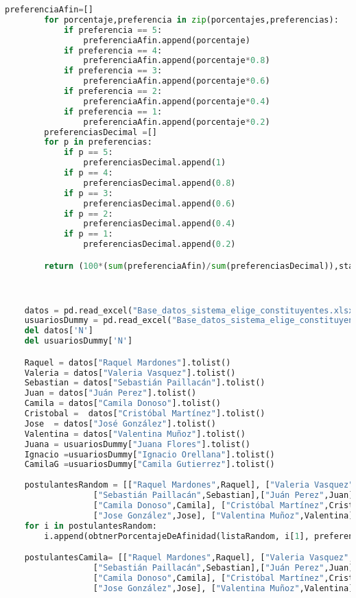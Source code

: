 \documentclass[a4paper]{article}
\begin{document}
\begin{lstlisting}[language = Python]
        preferenciaAfin=[]
        for porcentaje,preferencia in zip(porcentajes,preferencias):
            if preferencia == 5:
                preferenciaAfin.append(porcentaje)
            if preferencia == 4:
                preferenciaAfin.append(porcentaje*0.8)
            if preferencia == 3:
                preferenciaAfin.append(porcentaje*0.6)
            if preferencia == 2:
                preferenciaAfin.append(porcentaje*0.4)
            if preferencia == 1:
                preferenciaAfin.append(porcentaje*0.2)
        preferenciasDecimal =[]
        for p in preferencias:
            if p == 5:
                preferenciasDecimal.append(1)
            if p == 4:
                preferenciasDecimal.append(0.8)
            if p == 3:
                preferenciasDecimal.append(0.6)
            if p == 2:
                preferenciasDecimal.append(0.4)
            if p == 1:
                preferenciasDecimal.append(0.2)

        return (100*(sum(preferenciaAfin)/sum(preferenciasDecimal)),statistics.pstdev(preferenciaAfin))



    datos = pd.read_excel("Base_datos_sistema_elige_constituyentes.xlsx")
    usuariosDummy = pd.read_excel("Base_datos_sistema_elige_constituyentes.xlsx", sheet_name = "Respuestas usuariosas")
    del datos['N']
    del usuariosDummy['N']

    Raquel = datos["Raquel Mardones"].tolist()
    Valeria = datos["Valeria Vasquez"].tolist()
    Sebastian = datos["Sebastián Paillacán"].tolist()
    Juan = datos["Juán Perez"].tolist()
    Camila = datos["Camila Donoso"].tolist()
    Cristobal =  datos["Cristóbal Martínez"].tolist()
    Jose  = datos["José González"].tolist()
    Valentina = datos["Valentina Muñoz"].tolist()
    Juana = usuariosDummy["Juana Flores"].tolist()
    Ignacio =usuariosDummy["Ignacio Orellana"].tolist()
    CamilaG =usuariosDummy["Camila Gutierrez"].tolist()
    
    postulantesRandom = [["Raquel Mardones",Raquel], ["Valeria Vasquez",Valeria], 
                  ["Sebastián Paillacán",Sebastian],["Juán Perez",Juan],
                  ["Camila Donoso",Camila], ["Cristóbal Martínez",Cristobal], 
                  ["Jose González",Jose], ["Valentina Muñoz",Valentina]]
    for i in postulantesRandom:
        i.append(obtnerPorcentajeDeAfinidad(listaRandom, i[1], preferencias))

    postulantesCamila= [["Raquel Mardones",Raquel], ["Valeria Vasquez",Valeria], 
                  ["Sebastián Paillacán",Sebastian],["Juán Perez",Juan],
                  ["Camila Donoso",Camila], ["Cristóbal Martínez",Cristobal], 
                  ["Jose González",Jose], ["Valentina Muñoz",Valentina]]
    

\end{lstlisting}
\end{document}

